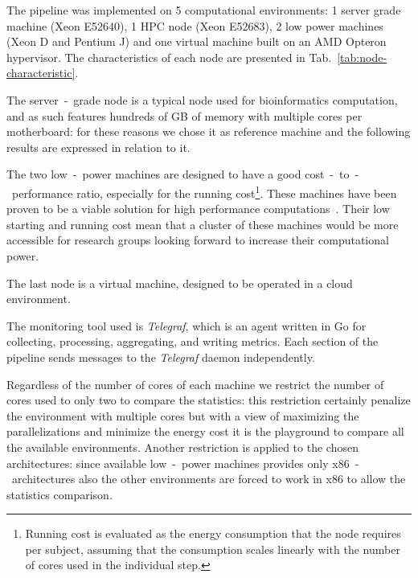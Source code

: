 \documentclass{standalone}
\begin{document}
The pipeline was implemented on 5 computational environments: 1 server grade machine (Xeon E52640), 1 HPC node (Xeon E52683), 2 low power machines (Xeon D and Pentium J) and one virtual machine built on an AMD Opteron hypervisor.
The characteristics of each node are presented in Tab.~\ref{tab:node-characteristic}.

The server~-~grade node is a typical node used for bioinformatics computation, and as such features hundreds of GB of memory with multiple cores per motherboard: for these reasons we chose it as reference machine and the following results are expressed in relation to it.

The two low~-~power machines are designed to have a good cost~-~to~-~performance ratio, especially for the running cost\footnote{
  Running cost is evaluated as the energy consumption that the node requires per subject, assuming that the consumption scales linearly with the number of cores used in the individual step.
}.
These machines have been proven to be a viable solution for high performance computations~\cite{Cesini2017}.
Their low starting and running cost mean that a cluster of these machines would be more accessible for research groups looking forward to increase their computational power.

The last node is a virtual machine, designed to be operated in a cloud environment.

The monitoring tool used is \emph{Telegraf}, which is an agent written in Go for collecting, processing, aggregating, and writing metrics.
Each section of the pipeline sends messages to the \emph{Telegraf} daemon independently.

Regardless of the number of cores of each machine we restrict the number of cores used to only two to compare the statistics: this restriction certainly penalize the environment with multiple cores but with a view of maximizing the parallelizations and minimize the energy cost it is the playground to compare all the available environments.
Another restriction is applied to the chosen architectures: since available low~-~power machines provides only x86~-~architectures also the other environments are forced to work in x86 to allow the statistics comparison.
\end{document}
